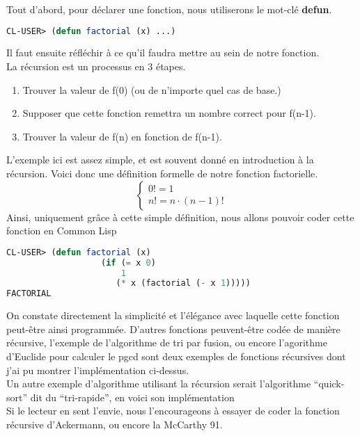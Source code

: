 \documentclass[a4paper, 12pt]{article}
\numberwithin{equation}{subsection}
\begin{document}
Tout d'abord, pour déclarer une fonction, nous utiliserons le mot-clé {\bf defun}.
\begin{lstlisting}[language=Lisp]
CL-USER> (defun factorial (x) ...)
\end{lstlisting}
Il faut ensuite réfléchir à ce qu'il faudra mettre au sein de notre fonction. \\
La récursion est un processus en 3 étapes. \\
\begin{enumerate}
  \item Trouver la valeur de f(0) (ou de n'importe quel cas de base.)
  \item Supposer que cette fonction remettra un nombre correct pour f(n-1).
  \item Trouver la valeur de f(n) en fonction de f(n-1).
\end{enumerate}
L'exemple ici est assez simple, et est souvent donné en introduction à la récursion. Voici donc une définition formelle de notre fonction factorielle. \\
$$\begin{cases}0! = 1 \\ n! = n \cdot (n - 1)! \end{cases}$$
Ainsi, uniquement grâce à cette simple définition, nous allons pouvoir coder cette fonction en Common Lisp \\
\begin{lstlisting}[language=Lisp]
CL-USER> (defun factorial (x)
                   (if (= x 0)
                       1
                      (* x (factorial (- x 1)))))
FACTORIAL
\end{lstlisting}
On constate directement la simplicité et l'élégance avec laquelle cette fonction peut-être ainsi programmée. D'autres fonctions peuvent-être codée de manière récursive, l'exemple de l'algorithme de tri par fusion, ou encore l'agorithme d'Euclide pour calculer le pgcd sont deux exemples de fonctions récursives dont j'ai pu montrer l'implémentation ci-dessus. \\
Un autre exemple d'algorithme utilisant la récursion serait l'algorithme ``quick-sort'' dit du ``tri-rapide'', en voici son implémentation \\


Si le lecteur en sent l'envie, nous l'encourageons à essayer de coder la fonction récursive d'Ackermann, ou encore la McCarthy 91. \\
\end{document}
